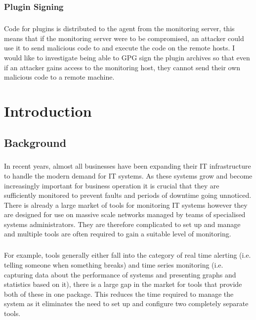 \documentclass[bsc,logo,twoside]{infthesis}
\begin{document}
\subsection{Plugin Signing}
\paragraph*{}
	Code for plugins is distributed to the agent from the monitoring server, this
	means that if the monitoring server were to be compromised, an attacker could
	use it to send malicious code to and execute the code on the remote hosts. I
	would like to investigate being able to GPG sign the plugin archives so that
	even if an attacker gains access to the monitoring host, they cannot send
	their own malicious code to a remote machine.
	

\chapter{Introduction}
\section{Background}
\paragraph*{}
	In recent years, almost all businesses have been expanding their IT 
	infrastructure to handle the modern demand for IT systems.  As these systems
	grow and become increasingly important for business operation it is crucial
	that they are sufficiently monitored to prevent faults and periods of downtime
	going unnoticed.  There is already a large market of tools for monitoring
	IT systems however they are designed for use on massive scale networks managed
	by teams of specialised systems administrators.  They are therefore
	complicated to set up and manage and multiple tools are often required to gain
	a suitable level of monitoring.
	
\paragraph*{}
	For example, tools generally either fall into
	the category of real time alerting (i.e. telling someone when something
	breaks) and time series monitoring (i.e. capturing data about the performance
	of systems and presenting graphs and statistics based on it), there is a large
	gap in the market for tools that provide both of these in one package. This
	reduces the time required to manage the system as it eliminates the need to
	set up and configure two completely separate tools.
\end{document}
